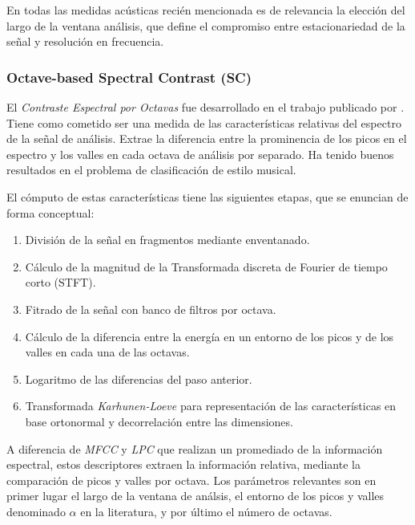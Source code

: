 \documentclass{article}
\begin{document}
En todas las medidas acústicas recién mencionada es de relevancia la elección del largo de la ventana análisis, que define el compromiso entre estacionariedad de la señal y resolución en frecuencia.

\subsubsection{Octave-based Spectral Contrast (SC)}

El \textit{Contraste Espectral por Octavas} fue desarrollado en el trabajo publicado por \cite{jiang2002music}. Tiene como cometido ser una medida de las características relativas del espectro de la señal de análisis. Extrae la diferencia entre la prominencia de los picos en el espectro y los valles en cada octava de análisis por separado. Ha tenido buenos resultados en el problema de clasificación de estilo musical.
\medskip

El cómputo de estas características tiene las siguientes etapas, que se enuncian de forma conceptual:

\begin{enumerate}
	\item División de la señal en fragmentos mediante enventanado.
	\item Cálculo de la magnitud de la Transformada discreta de Fourier de tiempo corto (STFT).
	\item Fitrado de la señal con banco de filtros por octava.
	\item Cálculo de la diferencia entre la energía en un entorno de los picos y de los valles en cada una de las octavas.
	\item Logaritmo de las diferencias del paso anterior.
	\item Transformada \textit{Karhunen-Loeve} para representación de las características en base ortonormal y decorrelación entre las dimensiones.
\end{enumerate}

A diferencia de \textit{MFCC} y \textit{LPC} que realizan un promediado de la información espectral, estos descriptores extraen la información relativa, mediante la comparación de picos y valles por octava. Los parámetros relevantes son en primer lugar el largo de la ventana de análsis, el entorno de los picos y valles denominado $\alpha$ en la literatura, y por último el número de octavas. 
\end{document}
